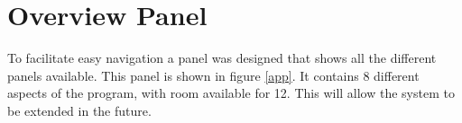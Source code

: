 

\section{Overview Panel}

To facilitate easy navigation a panel was designed that shows all the different panels available. This panel is shown in figure \ref{app}. It contains 8 different aspects of the program, with room available for 12. This will allow the system to be extended in the future. 





